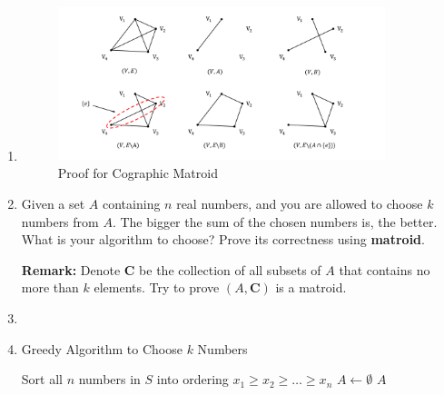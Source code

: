 \documentclass[12pt,a4paper]{article}
\makeatletter
\newtheorem*{solution}{Solution}
\theoremstyle{definition}
\renewenvironment{solution}[1][Solution] {\par\pushQED{\qed}\normalfont\topsep6\p@\@plus6\p@\relax\trivlist\item[\hskip\labelsep\bfseries#1\@addpunct{.}]\ignorespaces}{\popQED\endtrivlist\@endpefalse} \makeatother
\makeatother
\begin{document}
\begin{enumerate}
\begin{enumerate}
\begin{solution}
\begin{figure}[htbp]
        \centering
        \includegraphics[width=0.9\textwidth]{Fig-CographicMatroid.pdf}
        \caption{Proof for Cographic Matroid}\label{Fig-Cographic}
    \end{figure}
    
	\end{solution}
	\item
	Given a set $A$ containing $n$ real numbers, and you are allowed to choose $k$ numbers from $A$. The bigger the sum of the chosen numbers is, the better. What is your algorithm to choose? Prove its correctness using \textbf{matroid}.\par
	\textbf{Remark:} Denote $\mathbf{C}$ be the collection of all subsets of $A$ that contains no more than $k$ elements. Try to prove $(A,\mathbf{C})$ is a matroid.\par
	\begin{solution}
	~\\
	\item 
	    \begin{minipage}[t]{0.8\textwidth}
        \begin{algorithm}[H]
        		
        \BlankLine
        \caption{Greedy Algorithm to Choose $k$ Numbers}
        \label{greedy-choose}
        Sort all $n$ numbers in $S$ into ordering $x_1\ge x_2\ge \dots \ge x_n$\;
        $A\leftarrow \emptyset$\;
        \Return $A$\;
        \end{algorithm}
        \end{minipage}
        

\end{solution}
\end{enumerate}
\end{enumerate}
\end{document}
